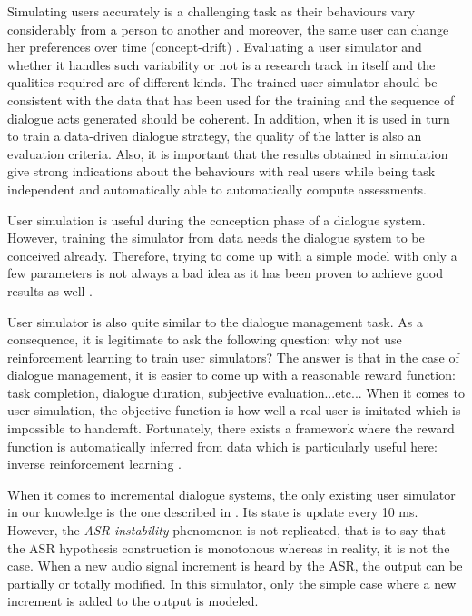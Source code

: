        	Simulating users accurately is a challenging task as their behaviours vary considerably from a person to another and moreover, the same user can change her preferences over time (concept-drift) \cite{Schatzmann2006}. Evaluating a user simulator and whether it handles such variability or not is a research track in itself \cite{Pietquin2013} and the qualities required are of different kinds. The trained user simulator should be consistent with the data that has been used for the training and the sequence of dialogue acts generated should be coherent. In addition, when it is used in turn to train a data-driven dialogue strategy, the quality of the latter is also an evaluation criteria. Also, it is important that the results obtained in simulation give strong indications about the behaviours with real users while being task independent and automatically able to automatically compute assessments.
        
        User simulation is useful during the conception phase of a dialogue system. However, training the simulator from data needs the dialogue system to be conceived already. Therefore, trying to come up with a simple model with only a few parameters is not always a bad idea as it has been proven to achieve good results as well \cite{Schatzmann2007}.
        
        User simulator is also quite similar to the dialogue management task. As a consequence, it is legitimate to ask the following question: why not use reinforcement learning to train user simulators? The answer is that in the case of dialogue management, it is easier to come up with a reasonable reward function: task completion, dialogue duration, subjective evaluation...etc... When it comes to user simulation, the objective function is how well a real user is imitated which is impossible to handcraft. Fortunately, there exists a framework where the reward function is automatically inferred from data which is particularly useful here: inverse reinforcement learning \cite{Chandramohan2011}.
        
        When it comes to incremental dialogue systems, the only existing user simulator in our knowledge is the one described in \cite{Selfridge2012b}. Its state is update every 10 ms. However, the \textit{ASR instability} phenomenon is not replicated, that is to say that the ASR hypothesis construction is monotonous whereas in reality, it is not the case. When a new audio signal increment is heard by the ASR, the output can be partially or totally modified. In this simulator, only the simple case where a new increment is added to the output is modeled.

